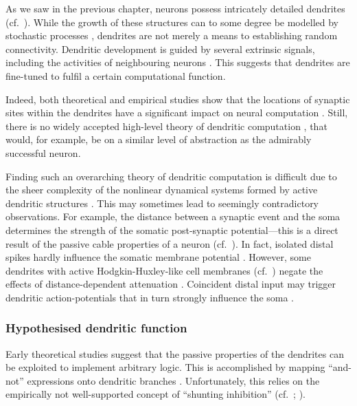 
As we saw in the previous chapter, neurons possess intricately detailed dendrites (cf.~).
While the growth of these structures can to some degree be modelled by stochastic processes \citep[e.g.,][]{nowakowski1992competitive}, dendrites are not merely a means to establishing random connectivity.
Dendritic development is guided by several extrinsic signals, including the activities of neighbouring neurons \citep{mcallister2000cellular}.
This suggests that dendrites are fine-tuned to fulfil a certain computational function.

Indeed, both theoretical and empirical studies show that the locations of synaptic sites within the dendrites have a significant impact on neural computation \citep{mel1994information,koch2002singlecell,polsky2004computational}.
Still, there is no widely accepted high-level theory of dendritic computation \citep{london2005dendritic}, that would, for example, be on a similar level of abstraction as the admirably successful \LIF neuron.

Finding such an overarching theory of dendritic computation is difficult due to the sheer complexity of the nonlinear dynamical systems formed by active dendritic structures \citep{beniaguev2021single}.
This may sometimes lead to seemingly contradictory observations.
For example, the distance between a synaptic event and the soma determines the strength of the somatic post-synaptic potential---this is a direct result of the passive cable properties of a neuron (cf.~).
In fact, isolated distal spikes hardly influence the somatic membrane potential \citep{stuart1998determinants}.
However, some dendrites with active Hodgkin-Huxley-like cell membranes (cf.~) negate the effects of distance-dependent attenuation \citep{koch2002singlecell}.
Coincident distal input may trigger dendritic action-potentials that in turn strongly influence the soma \citep{williams2002dependence}.

\subsubsection{Hypothesised dendritic function}
Early theoretical studies suggest that the passive properties of the dendrites can be exploited to implement arbitrary logic.
This is accomplished by mapping \enquote{and-not} expressions onto dendritic branches \citep{koch1983nonlinear,mel1994information,london2005dendritic}.
Unfortunately, this relies on the empirically not well-supported concept of \enquote{shunting inhibition} (cf.~; \cite{holt1997shunting,abbott2005drivers}).

